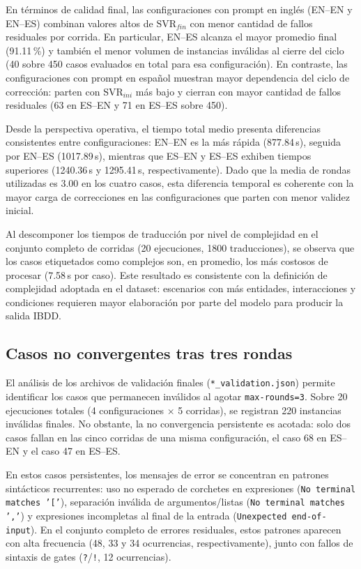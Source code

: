 En términos de calidad final, las configuraciones con prompt en inglés (EN--EN y EN--ES) combinan valores altos de $\text{SVR}_{fin}$ con menor cantidad de fallos residuales por corrida. En particular, EN--ES alcanza el mayor promedio final (91.11\,\%) y también el menor volumen de instancias inválidas al cierre del ciclo (40 sobre 450 casos evaluados en total para esa configuración). En contraste, las configuraciones con prompt en español muestran mayor dependencia del ciclo de corrección: parten con $\text{SVR}_{ini}$ más bajo y cierran con mayor cantidad de fallos residuales (63 en ES--EN y 71 en ES--ES sobre 450).

Desde la perspectiva operativa, el tiempo total medio presenta diferencias consistentes entre configuraciones: EN--EN es la más rápida (877.84\,s), seguida por EN--ES (1017.89\,s), mientras que ES--EN y ES--ES exhiben tiempos superiores (1240.36\,s y 1295.41\,s, respectivamente). Dado que la media de rondas utilizadas es 3.00 en los cuatro casos, esta diferencia temporal es coherente con la mayor carga de correcciones en las configuraciones que parten con menor validez inicial.

Al descomponer los tiempos de traducción por nivel de complejidad en el conjunto completo de corridas (20 ejecuciones, 1800 traducciones), se observa que los casos etiquetados como complejos son, en promedio, los más costosos de procesar (7.58\,s por caso). Este resultado es consistente con la definición de complejidad adoptada en el dataset: escenarios con más entidades, interacciones y condiciones requieren mayor elaboración por parte del modelo para producir la salida IBDD.

\subsection{Casos no convergentes tras tres rondas}

El análisis de los archivos de validación finales (\texttt{*\_validation.json}) permite identificar los casos que permanecen inválidos al agotar \texttt{max-rounds=3}. Sobre 20 ejecuciones totales (4 configuraciones $\times$ 5 corridas), se registran 220 instancias inválidas finales. No obstante, la no convergencia persistente es acotada: solo dos casos fallan en las cinco corridas de una misma configuración, el caso 68 en ES--EN y el caso 47 en ES--ES.

En estos casos persistentes, los mensajes de error se concentran en patrones sintácticos recurrentes: uso no esperado de corchetes en expresiones (\texttt{No terminal matches '['}), separación inválida de argumentos/listas (\texttt{No terminal matches ','}) y expresiones incompletas al final de la entrada (\texttt{Unexpected end-of-input}). En el conjunto completo de errores residuales, estos patrones aparecen con alta frecuencia (48, 33 y 34 ocurrencias, respectivamente), junto con fallos de sintaxis de gates (\texttt{?}/\texttt{!}, 12 ocurrencias).

